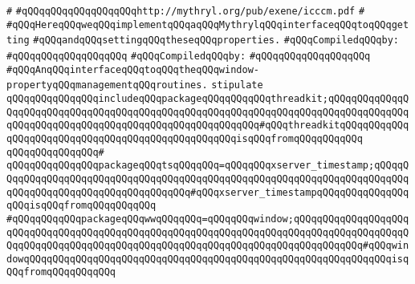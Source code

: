 \verb|#|\newline
\verb|#qQQqqQQqqQQqqQQqqQQqhttp://mythryl.org/pub/exene/icccm.pdf|\newline
\verb|#|\newline
\verb|#qQQqHereqQQqweqQQqimplementqQQqaqQQqMythrylqQQqinterfaceqQQqtoqQQqgetting|\newline
\verb|#qQQqandqQQqsettingqQQqtheseqQQqproperties.|\newline
\newline
\verb|#qQQqCompiledqQQqby:|\newline
\verb|#qQQqqQQqqQQqqQQqqQQq|\newline
\newline
\newline
\verb|#qQQqCompiledqQQqby:|\newline
\verb|#qQQqqQQqqQQqqQQqqQQq|\newline
\newline
\newline
\newline
\verb|#qQQqAnqQQqinterfaceqQQqtoqQQqtheqQQqwindow-propertyqQQqmanagementqQQqroutines.|\newline
\newline
\verb|stipulate|\newline
\verb|qQQqqQQqqQQqqQQqincludeqQQqpackageqQQqqQQqqQQqthreadkit;qQQqqQQqqQQqqQQqqQQqqQQqqQQqqQQqqQQqqQQqqQQqqQQqqQQqqQQqqQQqqQQqqQQqqQQqqQQqqQQqqQQqqQQqqQQqqQQqqQQqqQQqqQQqqQQqqQQqqQQqqQQqqQQq#qQQqthreadkitqQQqqQQqqQQqqQQqqQQqqQQqqQQqqQQqqQQqqQQqqQQqqQQqqQQqisqQQqfromqQQqqQQqqQQq|\newline
\verb|qQQqqQQqqQQqqQQq#|\newline
\verb|qQQqqQQqqQQqqQQqpackageqQQqtsqQQqqQQq=qQQqqQQqxserver_timestamp;qQQqqQQqqQQqqQQqqQQqqQQqqQQqqQQqqQQqqQQqqQQqqQQqqQQqqQQqqQQqqQQqqQQqqQQqqQQqqQQqqQQqqQQqqQQqqQQqqQQqqQQqqQQq#qQQqxserver_timestampqQQqqQQqqQQqqQQqqQQqisqQQqfromqQQqqQQqqQQq|\newline
\verb|#qQQqqQQqqQQqpackageqQQqwwqQQqqQQq=qQQqqQQqwindow;qQQqqQQqqQQqqQQqqQQqqQQqqQQqqQQqqQQqqQQqqQQqqQQqqQQqqQQqqQQqqQQqqQQqqQQqqQQqqQQqqQQqqQQqqQQqqQQqqQQqqQQqqQQqqQQqqQQqqQQqqQQqqQQqqQQqqQQqqQQqqQQqqQQqqQQq#qQQqwindowqQQqqQQqqQQqqQQqqQQqqQQqqQQqqQQqqQQqqQQqqQQqqQQqqQQqqQQqqQQqqQQqisqQQqfromqQQqqQQqqQQq|\newline
